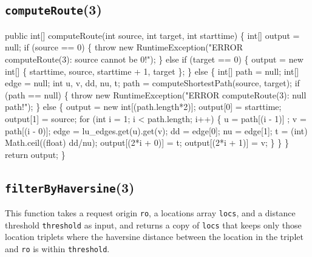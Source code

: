\documentclass{article}
\def\nwendcode{\endtrivlist \endgroup}      %
\let\nwdocspar=\par
\begin{document}
\subsection{{\tt{}\protect{}computeRoute}(3)}
\nwenddocs{}\endmoddef{}
public int[] computeRoute(int source, int target, int starttime) \{
  int[] output = null;
  if (source == 0) \{
    throw new RuntimeException("ERROR computeRoute(3): source cannot be 0!");
  \} else if (target == 0) \{
    output = new int[] \{ starttime, source, starttime + 1, target \};
  \} else \{
    int[] path = null;
    int[] edge = null;
    int u, v, dd, nu, t;
    path = computeShortestPath(source, target);
    if (path == null) \{
      throw new RuntimeException("ERROR computeRoute(3): null path!");
    \} else \{
      output = new int[(path.length*2)];
      output[0] = starttime;
      output[1] = source;
      for (int i = 1; i < path.length; i++) \{
        u = path[(i - 1)] ;
        v = path[(i - 0)];
        edge = lu_edges.get(u).get(v);
        dd = edge[0];
        nu = edge[1];
        t = (int) Math.ceil((float) dd/nu);
        output[(2*i + 0)] = t;
        output[(2*i + 1)] = v;
      \}
    \}
  \}
  return output;
\}
\eatline
{}\nwendcode{}\nwdocspar
\subsection{{\tt{}\protect{}filterByHaversine}(3)}
This function takes a request origin {\tt{}ro}, a locations array {\tt{}locs}, and
a distance threshold {\tt{}threshold} as input, and returns a copy of {\tt{}locs}
that keeps only those location triplets where the haversine distance between
the location in the triplet and {\tt{}ro} is within {\tt{}threshold}.
\end{document}
